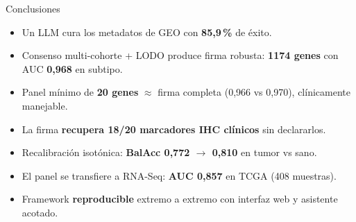 \documentclass[aspectratio=169, 11pt]{beamer}
\begin{document}
\begin{frame}{Conclusiones}
  \vspace{0.05cm}
  {\small
  \begin{itemize}\setlength\itemsep{2pt}
    \item Un LLM cura los metadatos de GEO con \textbf{85,9\,\%} de éxito.

    \item Consenso multi-cohorte + LODO produce firma robusta:
    \textbf{1174 genes} con AUC \textbf{0,968} en subtipo.

    \item Panel mínimo de \textbf{20 genes} $\approx$ firma completa
    (0,966 vs 0,970), clínicamente manejable.

    \item La firma \textbf{recupera 18/20 marcadores IHC cl\'inicos} sin
    declararlos.

    \item Recalibración isotónica: \textbf{BalAcc 0,772 $\to$ 0,810}
    en tumor vs sano.

    \item El panel se transfiere a RNA-Seq: \textbf{AUC 0,857}
    en TCGA (408 muestras).

    \item Framework \textbf{reproducible} extremo a extremo con interfaz
    web y asistente acotado.
  \end{itemize}}
\end{frame}
\end{document}

